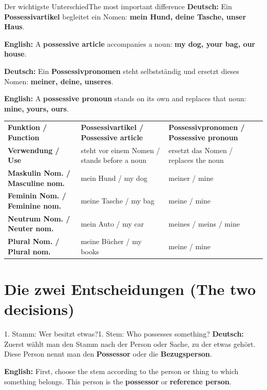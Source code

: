 \documentclass[a4paper,11pt]{article}
\newcommand{\GermanText}[1]{\textbf{Deutsch: }#1\par}
\newcommand{\EnglishText}[1]{{\small\color{SoftGray}\textbf{English: }#1\par}}
\begin{document}
        \begin{grammarentry}{Der wichtigste Unterschied}{The most important difference}
            \GermanText{Ein \textbf{Possessivartikel} begleitet ein Nomen: \textbf{mein Hund, deine Tasche, unser Haus}.}
            \EnglishText{A \textbf{possessive article} accompanies a noun: \textbf{my dog, your bag, our house}.}

            \GermanText{Ein \textbf{Possessivpronomen} steht selbstständig und ersetzt dieses Nomen: \textbf{meiner, deine, unseres}.}
            \EnglishText{A \textbf{possessive pronoun} stands on its own and replaces that noun: \textbf{mine, yours, ours}.}
        \end{grammarentry}

        \begin{longtable}{>{\bfseries}p{3.3cm}|p{5.7cm}|p{5.7cm}}
            \rowcolor{HeaderBlueDark}
            \color{white}\textbf{Funktion / Function} &
            \color{white}\textbf{Possessivartikel / Possessive article} &
            \color{white}\textbf{Possessivpronomen / Possessive pronoun} \\
            Verwendung / Use & steht vor einem Nomen / stands before a noun & ersetzt das Nomen / replaces the noun \\
            Maskulin Nom. / Masculine nom. & mein Hund / my dog & meiner / mine \\
            Feminin Nom. / Feminine nom. & meine Tasche / my bag & meine / mine \\
            Neutrum Nom. / Neuter nom. & mein Auto / my car & meines / meins / mine \\
            Plural Nom. / Plural nom. & meine Bücher / my books & meine / mine \\
        \end{longtable}

    \section{Die zwei Entscheidungen \textnormal{(The two decisions)}}

        \begin{grammarentry}{1. Stamm: Wer besitzt etwas?}{1. Stem: Who possesses something?}
            \GermanText{Zuerst wählt man den Stamm nach der Person oder Sache, zu der etwas gehört. Diese Person nennt man den \textbf{Possessor} oder die \textbf{Bezugsperson}.}
            \EnglishText{First, choose the stem according to the person or thing to which something belongs. This person is the \textbf{possessor} or \textbf{reference person}.}
        \end{grammarentry}
\end{document}
